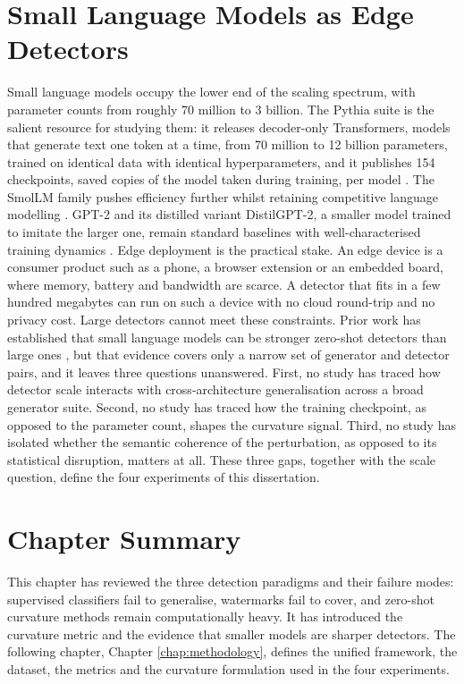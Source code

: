 \documentclass[logo,msc,cs]{infthesis}      %
\begin{document}
\newpage
\section{Small Language Models as Edge Detectors}
\label{sec:slm}
Small language models occupy the lower end of the scaling spectrum, with parameter counts from roughly 70 million to 3 billion. The Pythia suite is the salient resource for studying them: it releases decoder-only Transformers, models that generate text one token at a time, from 70 million to 12 billion parameters, trained on identical data with identical hyperparameters, and it publishes 154 checkpoints, saved copies of the model taken during training, per model \citep{biderman2023pythia}. The SmolLM family pushes efficiency further whilst retaining competitive language modelling \citep{allal2024smollm}. GPT-2 and its distilled variant DistilGPT-2, a smaller model trained to imitate the larger one, remain standard baselines with well-characterised training dynamics \citep{radford2019language, sanh2019distilbert}.
Edge deployment is the practical stake. An edge device is a consumer product such as a phone, a browser extension or an embedded board, where memory, battery and bandwidth are scarce. A detector that fits in a few hundred megabytes can run on such a device with no cloud round-trip and no privacy cost. Large detectors cannot meet these constraints. Prior work has established that small language models can be stronger zero-shot detectors than large ones \citep{mireshghallah2023smaller}, but that evidence covers only a narrow set of generator and detector pairs, and it leaves three questions unanswered. First, no study has traced how detector scale interacts with cross-architecture generalisation across a broad generator suite. Second, no study has traced how the training checkpoint, as opposed to the parameter count, shapes the curvature signal. Third, no study has isolated whether the semantic coherence of the perturbation, as opposed to its statistical disruption, matters at all. These three gaps, together with the scale question, define the four experiments of this dissertation.

\section{Chapter Summary}
\label{sec:background_summary}
This chapter has reviewed the three detection paradigms and their failure modes: supervised classifiers fail to generalise, watermarks fail to cover, and zero-shot curvature methods remain computationally heavy. It has introduced the curvature metric and the evidence that smaller models are sharper detectors. The following chapter, Chapter \ref{chap:methodology}, defines the unified framework, the dataset, the metrics and the curvature formulation used in the four experiments.
\end{document}
